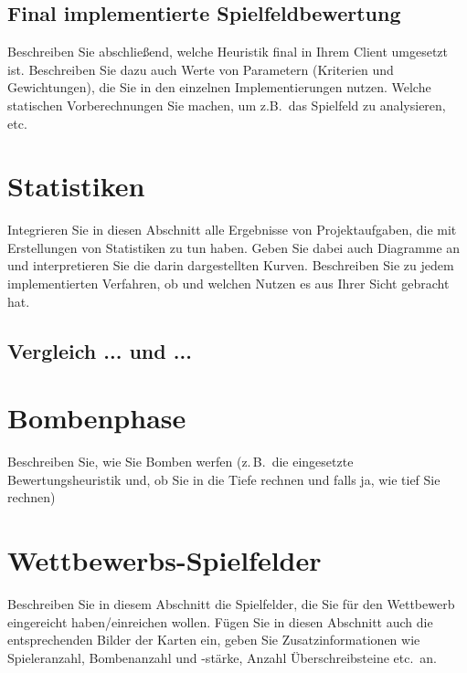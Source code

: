 \documentclass[12pt,a4paper]{article}
\begin{document}
\subsection{Final implementierte Spielfeldbewertung}
Beschreiben Sie abschließend, welche Heuristik final in Ihrem Client umgesetzt ist. Beschreiben Sie dazu auch Werte von Parametern (Kriterien und Gewichtungen), die Sie in den einzelnen Implementierungen nutzen. Welche statischen Vorberechnungen Sie machen, um z.B.\ das Spielfeld zu analysieren, etc.


\newpage
\section{Statistiken}
Integrieren Sie in diesen Abschnitt alle Ergebnisse von Projektaufgaben, die mit Erstellungen von Statistiken zu tun haben. Geben Sie dabei auch Diagramme an und interpretieren Sie die darin dargestellten Kurven. Beschreiben Sie zu jedem implementierten Verfahren, ob und welchen Nutzen es aus Ihrer Sicht gebracht hat.

\subsection{Vergleich ... und ...}

\newpage
\section{Bombenphase}
Beschreiben Sie, wie Sie Bomben werfen (z.\,B.\ die eingesetzte Bewertungsheuristik und, ob Sie in die Tiefe rechnen und falls ja, wie tief Sie rechnen)


\newpage
\section{Wettbewerbs-Spielfelder}
Beschreiben Sie in diesem Abschnitt die Spielfelder, die Sie für den Wettbewerb eingereicht haben/einreichen wollen. Fügen Sie in diesen Abschnitt auch die entsprechenden Bilder der Karten ein, geben Sie Zusatzinformationen wie Spieleranzahl, Bombenanzahl und -stärke, Anzahl Überschreibsteine etc.\ an.
\end{document}
